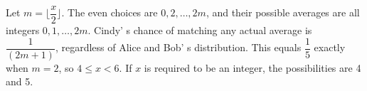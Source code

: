 Let $m=\lfloor \dfrac{x}{2}\rfloor$. The even choices are $0,2,\ldots,2m$, and their possible averages are all integers $0,1,\ldots,2m$. Cindy' s chance of matching any actual average is $\dfrac{1}{(2m+1)}$, regardless of Alice and Bob' s distribution. This equals $\dfrac{1}{5}$ exactly when $m=2$, so $\boxed{4\le x<6}$. If $x$ is required to be an integer, the possibilities are 4 and 5.
